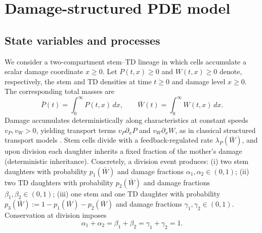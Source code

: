 \documentclass[pdflatex,sn-mathphys-ay]{sn-jnl}
\theoremstyle{thmstyleone}
\theoremstyle{definition}
\theoremstyle{remark}
\begin{document}
\section{Damage-structured PDE model}
\label{sec:model}

\subsection{State variables and processes}
\label{subsec:state_processes}
We consider a two-compartment stem--TD lineage in which cells accumulate a scalar damage coordinate $x\ge 0$. Let
$P(t,x)\ge 0$ and $W(t,x)\ge 0$ denote, respectively, the stem and TD densities at time $t\ge 0$ and damage level $x\ge 0$. The corresponding total masses are
\begin{equation}\label{eq:totals_def}
\bar P(t)=\int_0^\infty P(t,x)\,dx,\qquad
\bar W(t)=\int_0^\infty W(t,x)\,dx.
\end{equation}
Damage accumulates deterministically along characteristics at constant speeds $v_P,v_W>0$, yielding transport terms $v_P\partial_x P$ and $v_W\partial_x W$, as in classical structured transport models \citep{perthame_transport_2007,perthame_introduction_2023}. Stem cells divide with a feedback-regulated rate $\lambda_P(\bar W)$, and upon division each daughter inherits a fixed fraction of the mother's damage (deterministic inheritance). Concretely, a division event produces:
(i) two stem daughters with probability $p_1(\bar W)$ and damage fractions $\alpha_1,\alpha_2\in(0,1)$;
(ii) two TD daughters with probability $p_2(\bar W)$ and damage fractions $\beta_1,\beta_2\in(0,1)$;
(iii) one stem and one TD daughter with probability $p_3(\bar W):=1-p_1(\bar W)-p_2(\bar W)$ and damage fractions $\gamma_1,\gamma_2\in(0,1)$.
Conservation at division imposes
\begin{equation}\label{eq:inherit_cons}
\alpha_1+\alpha_2=\beta_1+\beta_2=\gamma_1+\gamma_2=1.
\end{equation}
\end{document}
